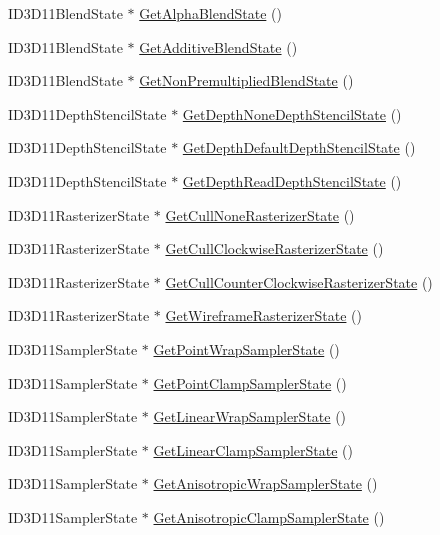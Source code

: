 \begin{DoxyCompactItemize}
I\+D3\+D11\+Blend\+State $\ast$ \hyperlink{structmage_1_1_rendering_state_cache_a19ad72ad35096722e3d61e58e0ab9205}{Get\+Alpha\+Blend\+State} ()
\item 
I\+D3\+D11\+Blend\+State $\ast$ \hyperlink{structmage_1_1_rendering_state_cache_afa897dcd0b71e4ff8e6ce6d8e31aaa71}{Get\+Additive\+Blend\+State} ()
\item 
I\+D3\+D11\+Blend\+State $\ast$ \hyperlink{structmage_1_1_rendering_state_cache_ae1b3d9745e1761e45908d9ad7c4f29dd}{Get\+Non\+Premultiplied\+Blend\+State} ()
\item 
I\+D3\+D11\+Depth\+Stencil\+State $\ast$ \hyperlink{structmage_1_1_rendering_state_cache_a5885a7c2a375bcb37d2139e04e162ecd}{Get\+Depth\+None\+Depth\+Stencil\+State} ()
\item 
I\+D3\+D11\+Depth\+Stencil\+State $\ast$ \hyperlink{structmage_1_1_rendering_state_cache_aaa928ab554db5e83354bca7f7d82308d}{Get\+Depth\+Default\+Depth\+Stencil\+State} ()
\item 
I\+D3\+D11\+Depth\+Stencil\+State $\ast$ \hyperlink{structmage_1_1_rendering_state_cache_adca5a3b2a24505f4c8bcad07ff1d3d42}{Get\+Depth\+Read\+Depth\+Stencil\+State} ()
\item 
I\+D3\+D11\+Rasterizer\+State $\ast$ \hyperlink{structmage_1_1_rendering_state_cache_af9c689e85b54cf0af4018c20e3ab61a1}{Get\+Cull\+None\+Rasterizer\+State} ()
\item 
I\+D3\+D11\+Rasterizer\+State $\ast$ \hyperlink{structmage_1_1_rendering_state_cache_a4055aaf84813811b94ed741c07cbee3c}{Get\+Cull\+Clockwise\+Rasterizer\+State} ()
\item 
I\+D3\+D11\+Rasterizer\+State $\ast$ \hyperlink{structmage_1_1_rendering_state_cache_aa41c6a83a929c09f040dddbd4e21d5fb}{Get\+Cull\+Counter\+Clockwise\+Rasterizer\+State} ()
\item 
I\+D3\+D11\+Rasterizer\+State $\ast$ \hyperlink{structmage_1_1_rendering_state_cache_a86d51235df703c952a1e50d95eae4244}{Get\+Wireframe\+Rasterizer\+State} ()
\item 
I\+D3\+D11\+Sampler\+State $\ast$ \hyperlink{structmage_1_1_rendering_state_cache_a4d1b6eef773700e3fb80195f93b484f9}{Get\+Point\+Wrap\+Sampler\+State} ()
\item 
I\+D3\+D11\+Sampler\+State $\ast$ \hyperlink{structmage_1_1_rendering_state_cache_aabf172b1363478d2570a242303e38838}{Get\+Point\+Clamp\+Sampler\+State} ()
\item 
I\+D3\+D11\+Sampler\+State $\ast$ \hyperlink{structmage_1_1_rendering_state_cache_abcd4b98f9c0170466551901845c86824}{Get\+Linear\+Wrap\+Sampler\+State} ()
\item 
I\+D3\+D11\+Sampler\+State $\ast$ \hyperlink{structmage_1_1_rendering_state_cache_a8fd935f6eaca18ee85eef482c4b0acf8}{Get\+Linear\+Clamp\+Sampler\+State} ()
\item 
I\+D3\+D11\+Sampler\+State $\ast$ \hyperlink{structmage_1_1_rendering_state_cache_a183a1b919105bd1758cc6fb6cdeab018}{Get\+Anisotropic\+Wrap\+Sampler\+State} ()
\item 
I\+D3\+D11\+Sampler\+State $\ast$ \hyperlink{structmage_1_1_rendering_state_cache_ad4b0894beba4725e53a5a7ca3b9085cb}{Get\+Anisotropic\+Clamp\+Sampler\+State} ()
\end{DoxyCompactItemize}
